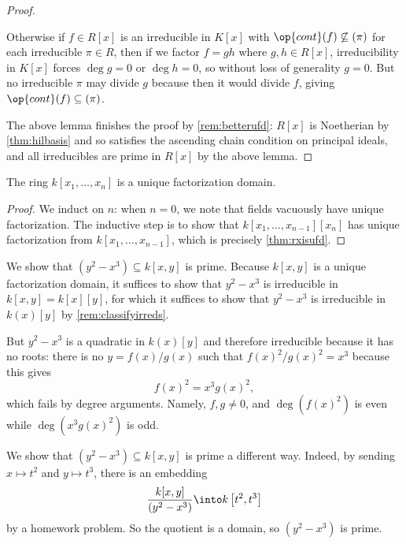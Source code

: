 \begin{proof}
\begin{remark}[Nir]
		Otherwise if $f\in R[x]$ is an irreducible in $K[x]$ with $\op{cont}(f)\not\subseteq(\pi)$ for each irreducible $\pi\in R$, then if we factor $f=gh$ where $g,h\in R[x]$, irreducibility in $K[x]$ forces $\deg g=0$ or $\deg h=0$, so without loss of generality $g=0$. But no irreducible $\pi$ may divide $g$ because then it would divide $f$, giving $\op{cont}(f)\subseteq(\pi)$.
	\end{remark}
	The above lemma finishes the proof by \autoref{rem:betterufd}: $R[x]$ is Noetherian by \autoref{thm:hilbasis} and so satisfies the ascending chain condition on principal ideals, and all irreducibles are prime in $R[x]$ by the above lemma.
\end{proof}
\begin{corollary}
	The ring $k[x_1,\ldots,x_n]$ is a unique factorization domain.
\end{corollary}
\begin{proof}
	We induct on $n$: when $n=0$, we note that fields vacuously have unique factorization. The inductive step is to show that $k[x_1,\ldots,x_{n-1}][x_n]$ has unique factorization from $k[x_1,\ldots,x_{n-1}]$, which is precisely \autoref{thm:rxisufd}.
\end{proof}
\begin{example}
	We show that $\left(y^2-x^3\right)\subseteq k[x,y]$ is prime. Because $k[x,y]$ is a unique factorization domain, it suffices to show that $y^2-x^3$ is irreducible in $k[x,y]=k[x][y]$, for which it suffices to show that $y^2-x^3$ is irreducible in $k(x)[y]$ by \autoref{rem:classifyirreds}.
	
	But $y^2-x^3$ is a quadratic in $k(x)[y]$ and therefore irreducible because it has no roots: there is no $y=f(x)/g(x)$ such that $f(x)^2/g(x)^2=x^3$ because this gives
	\[f(x)^2=x^3g(x)^2,\]
	which fails by degree arguments. Namely, $f,g\ne0$, and $\deg\left(f(x)^2\right)$ is even while $\deg\left(x^3g(x)^2\right)$ is odd.
\end{example}
\begin{example}
	We show that $\left(y^2-x^3\right)\subseteq k[x,y]$ is prime a different way. Indeed, by sending $x\mapsto t^2$ and $y\mapsto t^3$, there is an embedding
	\[\frac{k[x,y]}{\left(y^2-x^3\right)}\into k\left[t^2,t^3\right]\]
	by a homework problem. So the quotient is a domain, so $\left(y^2-x^3\right)$ is prime.
\end{example}

